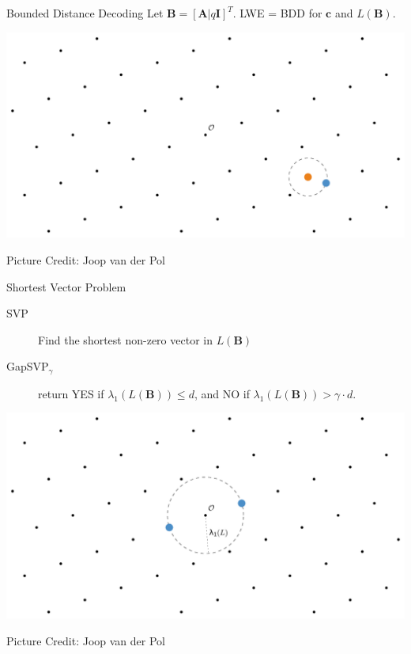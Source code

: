\documentclass[presentation,smaller]{beamer}
\renewcommand{\vec}[1]{\ensuremath{\mathbf{#1}}\xspace}
\begin{document}
\begin{frame}[label={sec:orgheadline10}]{Bounded Distance Decoding}
Let \(\vec{B} = [\vec{A} | q\vec{I}]^T\). LWE = BDD for \(\vec{c}\) and \(L(\vec{B})\).

\includegraphics[width=.9\linewidth]{./joop-cvp.pdf}

\tiny Picture Credit: Joop van der Pol
\end{frame}


\begin{frame}[label={sec:orgheadline11}]{Shortest Vector Problem}
\begin{description}
\item[{SVP}] Find the shortest non-zero vector in \(L(\vec{B})\)
\item[{GapSVP\(_γ\)}] return YES if \(λ_1(L(\vec{B})) ≤ d\), and NO if \(λ_1(L(\vec{B})) > γ⋅d\).
\end{description}

\begin{center}
\includegraphics[width=.9\linewidth]{./joop-l1.pdf}
\end{center}

\tiny Picture Credit: Joop van der Pol
\end{frame}
\end{document}

